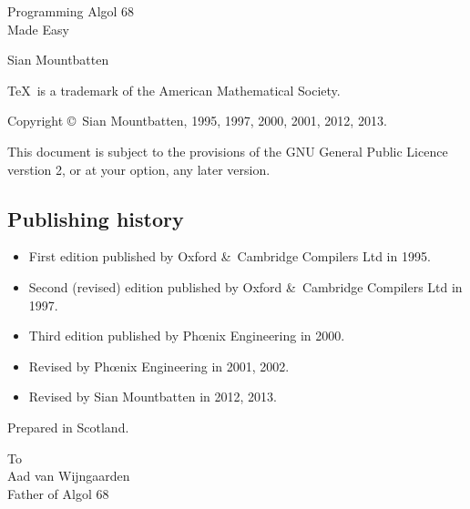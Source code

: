 %
\thispagestyle{empty}
\vglue 20mm
\begin{center}
\Huge Programming Algol 68\\ Made Easy
\end{center}
\vskip 10mm
\begin{center}
\Large Sian Mountbatten
\end{center}
\newpage
\thispagestyle{empty}
\parindent=0mm
\vfill
\small
\TeX\ is a trademark of the American Mathematical Society.\par
\smallskip
Copyright \copyright\ Sian Mountbatten, 1995, 1997, 2000, 2001, 2012, 2013.\par
\medskip
This document is subject to the provisions of the GNU General Public
Licence verstion 2, or at your option, any later version.\par
\bigskip
\subsection*{Publishing history}
\begin{itemize}
\item First edition published by Oxford \&\ Cambridge Compilers Ltd
in 1995.
\item Second (revised) edition published by Oxford \&\ Cambridge
Compilers Ltd in 1997.
\item Third edition published by Ph\oe{}nix Engineering in 2000.
\item Revised by Ph\oe{}nix Engineering in 2001, 2002.
\item Revised by Sian Mountbatten in 2012, 2013.
\end{itemize}
\vfill
Prepared in Scotland.
\newpage
\thispagestyle{empty}
\vglue 40mm
\begin{flushright}
\textsf To\\
\medskip
\Large Aad van Wijngaarden\\
\bigskip\medskip
\normalsize Father of Algol 68
\end{flushright}
\newpage
